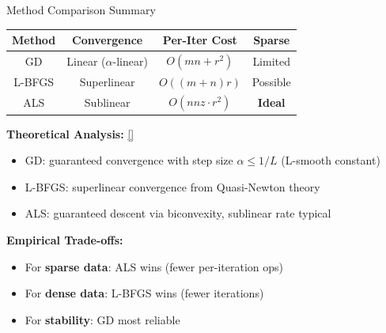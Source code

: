 \documentclass[aspectratio=169,usenames,dvipsnames]{beamer}
\begin{document}
\begin{frame}{Method Comparison Summary}

\begin{center}
\renewcommand{\arraystretch}{1.4}
\begin{tabular}{|c|c|c|c|}
\hline
\textbf{Method} & \textbf{Convergence} & \textbf{Per-Iter Cost} & \textbf{Sparse} \\
\hline
GD & Linear ($\alpha$-linear) & $O(mn + r^2)$ & Limited \\
\hline
L-BFGS & Superlinear & $O((m+n)r)$ & Possible \\
\hline
ALS & Sublinear & $O(nnz \cdot r^2)$ & \textbf{Ideal} \\
\hline
\end{tabular}
\end{center}

\vspace{0.5cm}

\textbf{Theoretical Analysis:} \hyperlink{app:convergence}{[\checkmark]}
\begin{itemize}
  \item GD: guaranteed convergence with step size $\alpha \leq 1/L$ (L-smooth constant)
  \item L-BFGS: superlinear convergence from Quasi-Newton theory
  \item ALS: guaranteed descent via biconvexity, sublinear rate typical
\end{itemize}

\vspace{0.3cm}

\textbf{Empirical Trade-offs:}
\begin{itemize}
  \item For \textbf{sparse data}: ALS wins (fewer per-iteration ops)
  \item For \textbf{dense data}: L-BFGS wins (fewer iterations)
  \item For \textbf{stability}: GD most reliable
\end{itemize}

\end{frame}
\end{document}
